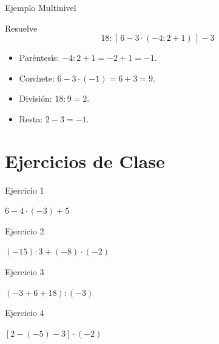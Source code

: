 \documentclass[aspectratio=169]{beamer}
\begin{document}
\begin{frame}{Ejemplo Multinivel}
  \begin{block}{Resuelve}
    \[
      18 : [\,6 - 3 \cdot (-4 : 2 + 1)\,] - 3
    \]
  \end{block}
  \vspace{6pt}
  \begin{mwpasos}
    \begin{itemize}
      \item Paréntesis: \; $-4 : 2 + 1 = -2 + 1 = -1$.
      \item Corchete: \; $6 - 3 \cdot (-1) = 6 + 3 = 9$.
      \item División: \; $18 : 9 = 2$.
      \item Resta: \; $2 - 3 = -1$.
    \end{itemize}
  \end{mwpasos}
\end{frame}

\section{Ejercicios de Clase}

\begin{frame}{Ejercicio 1}
  \begin{mwejercicio}
    $6 - 4 \cdot (-3) + 5$
  \end{mwejercicio}
\end{frame}

\begin{frame}{Ejercicio 2}
  \begin{mwejercicio}
    $(-15) : 3 + (-8) \cdot (-2)$
  \end{mwejercicio}
\end{frame}

\begin{frame}{Ejercicio 3}
  \begin{mwejercicio}
    $(-3 + 6 + 18) : (-3)$
  \end{mwejercicio}
\end{frame}

\begin{frame}{Ejercicio 4}
  \begin{mwejercicio}
    $[2 - (-5) - 3] \cdot (-2)$
  \end{mwejercicio}
\end{frame}
\end{document}
